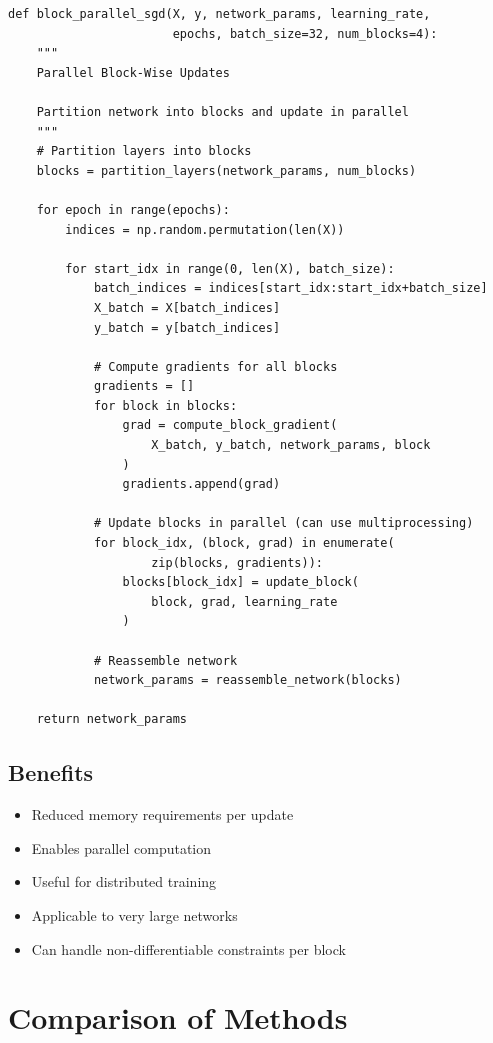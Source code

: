 \documentclass{tufte-handout}
\begin{document}
\begin{lstlisting}
def block_parallel_sgd(X, y, network_params, learning_rate, 
                       epochs, batch_size=32, num_blocks=4):
    """
    Parallel Block-Wise Updates
    
    Partition network into blocks and update in parallel
    """
    # Partition layers into blocks
    blocks = partition_layers(network_params, num_blocks)
    
    for epoch in range(epochs):
        indices = np.random.permutation(len(X))
        
        for start_idx in range(0, len(X), batch_size):
            batch_indices = indices[start_idx:start_idx+batch_size]
            X_batch = X[batch_indices]
            y_batch = y[batch_indices]
            
            # Compute gradients for all blocks
            gradients = []
            for block in blocks:
                grad = compute_block_gradient(
                    X_batch, y_batch, network_params, block
                )
                gradients.append(grad)
            
            # Update blocks in parallel (can use multiprocessing)
            for block_idx, (block, grad) in enumerate(
                    zip(blocks, gradients)):
                blocks[block_idx] = update_block(
                    block, grad, learning_rate
                )
            
            # Reassemble network
            network_params = reassemble_network(blocks)
    
    return network_params
\end{lstlisting}

\subsection{Benefits}
\begin{itemize}
    \item Reduced memory requirements per update
    \item Enables parallel computation
    \item Useful for distributed training
    \item Applicable to very large networks
    \item Can handle non-differentiable constraints per block
\end{itemize}

\section{Comparison of Methods}
\end{document}
